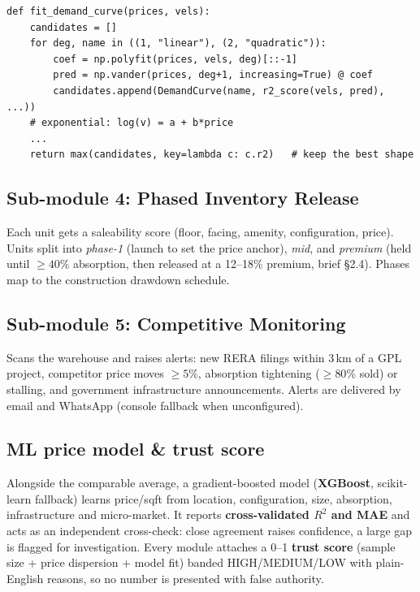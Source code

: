 \documentclass[11pt,a4paper]{article}
\begin{document}
\begin{lstlisting}[caption={Best-fit demand-curve selection (excerpt, \texttt{models/launch\_pricing.py}).}]
def fit_demand_curve(prices, vels):
    candidates = []
    for deg, name in ((1, "linear"), (2, "quadratic")):
        coef = np.polyfit(prices, vels, deg)[::-1]
        pred = np.vander(prices, deg+1, increasing=True) @ coef
        candidates.append(DemandCurve(name, r2_score(vels, pred), ...))
    # exponential: log(v) = a + b*price
    ...
    return max(candidates, key=lambda c: c.r2)   # keep the best shape
\end{lstlisting}

\subsection{Sub-module 4: Phased Inventory Release}
Each unit gets a saleability score (floor, facing, amenity, configuration,
price). Units split into \emph{phase-1} (launch to set the price anchor),
\emph{mid}, and \emph{premium} (held until $\ge40\%$ absorption, then released at
a 12--18\% premium, brief \S2.4). Phases map to the construction drawdown schedule.

\subsection{Sub-module 5: Competitive Monitoring}
Scans the warehouse and raises alerts: new RERA filings within 3\,km of a GPL
project, competitor price moves $\ge5\%$, absorption tightening ($\ge80\%$ sold)
or stalling, and government infrastructure announcements. Alerts are delivered by
email and WhatsApp (console fallback when unconfigured).

\subsection{ML price model \& trust score}
Alongside the comparable average, a gradient-boosted model
(\textbf{XGBoost}, scikit-learn fallback) learns price/sqft from location,
configuration, size, absorption, infrastructure and micro-market. It reports
\textbf{cross-validated $R^2$ and MAE} and acts as an independent cross-check:
close agreement raises confidence, a large gap is flagged for investigation.
Every module attaches a 0--1 \textbf{trust score} (sample size + price dispersion
+ model fit) banded HIGH/MEDIUM/LOW with plain-English reasons, so no number is
presented with false authority.

\end{document}
